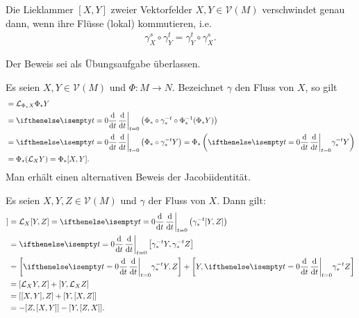 
\begin{Satz}
  Die Lieklammer $[X,Y]$ zweier Vektorfelder $X,Y \in \mathcal V(M)$ verschwindet genau dann, wenn ihre Flüsse (lokal) kommutieren, i.e.
  \begin{align*}
    \gamma_X^s \circ \gamma_Y^t = \gamma_Y^t \circ \gamma_X^s.
  \end{align*}
\end{Satz}

Der Beweis sei als Übungsaufgabe überlassen.

Es seien $X,Y \in \mathcal V(M)$ und $\Phi \colon M \to N$.
Bezeichnet $\gamma$ den Fluss von $X$, so gilt
\begin{align*}
  [\Phi_{\ast}X,\Phi_{\ast}Y] & = \mathcal L_{\Phi_{\ast}X} \Phi_{\ast}Y\\
  & = \difffrac[t=0]{}{t}\left(\Phi_{\ast} \circ \gamma_{\ast}^{-t} \circ \Phi_{\ast}^{-1}(\Phi_{\ast}Y)\right)\\
  & = \difffrac[t=0]{}{t} \left(\Phi_{\ast} \circ \gamma_{\ast}^{-t}Y\right) 
  = \Phi_{\ast}\left(\difffrac[t=0]{}{t}\gamma_{\ast}^{-t}Y\right)\\
  & = \Phi_{\ast}(\mathcal L_XY) = \Phi_{\ast}[X,Y].
\end{align*}
Man erhält einen alternativen Beweis der Jacobiidentität.

\begin{bew}
  Es seien $X,Y, Z \in \mathcal V(M)$ und $\gamma$ der Fluss von $X$.
  Dann gilt:
  \begin{align*}
    [X,[Y,Z]] & = \mathcal L_X[Y,Z] 
    = \difffrac[t=0]{}{t}\left(\gamma_{\ast}^{-t}[Y,Z]\right)\\
    & = \difffrac[t=0]{}{t}\left[\gamma_{\ast}^{-t}Y,\gamma_{\ast}^{-t}Z\right]\\
    & = \left[\difffrac[t=0]{}{t} \gamma_{\ast}^{-t}Y,Z\right] + \left[Y, \difffrac[t=0]{}{t}\gamma_{\ast}^{-t}Z\right]\\
    & = [\mathcal L_XY,Z] + [Y,\mathcal L_XZ]\\
    & = [[X,Y],Z] + [Y,[X,Z]]\\
    & = -[Z,[X,Y]] - [Y,[Z,X]].
  \end{align*}
\end{bew}

